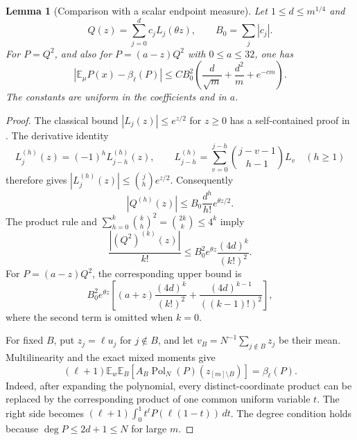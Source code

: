 \documentclass[11pt]{article}
\newtheorem{lemma}{Lemma}
\newcommand{\E}{\mathbb E}
\newcommand{\Pol}{\operatorname{Pol}}
\begin{document}
\begin{lemma}[Comparison with a scalar endpoint measure]\label{comparison}
Let $1\le d\le m^{1/4}$ and
\[
 Q(z)=\sum_{j=0}^d c_jL_j(\theta z),\qquad
 B_0=\sum_j|c_j|.
\]
For $P=Q^2$, and also for $P=(a-z)Q^2$ with $0\le a\le32$, one has
\[
 \left|\E_\mu P(x)-\beta_\ell(P)\right|
 \le C B_0^2\left(\frac d{\sqrt m}+\frac{d^2}{m}+e^{-cm}\right).
\tag{*}
\]
The constants are uniform in the coefficients and in $a$.
\end{lemma}
\begin{proof}
The classical bound $|L_j(z)|\le e^{z/2}$ for $z\ge0$ has a
self-contained proof in
.
The derivative identity
\[
 L_j^{(h)}(z)=(-1)^hL_{j-h}^{(h)}(z),\qquad
 L_{j-h}^{(h)}=\sum_{v=0}^{j-h}\binom{j-v-1}{h-1}L_v
 \quad(h\ge1)
\]
therefore gives $|L_j^{(h)}(z)|\le\binom jh e^{z/2}$.
Consequently
\[
 |Q^{(h)}(z)|\le B_0\frac{d^h}{h!}e^{\theta z/2}.
\]
The product rule and
$\sum_{h=0}^k\binom kh^2=\binom{2k}k\le4^k$ imply
\begin{equation}\label{squarederivatives}
 \frac{|(Q^2)^{(k)}(z)|}{k!}
 \le B_0^2 e^{\theta z}\frac{(4d)^k}{(k!)^2}.
\end{equation}
For $P=(a-z)Q^2$, the corresponding upper bound is
\begin{equation}\label{linear-squarederivatives}
 B_0^2 e^{\theta z}\left[
  (a+z)\frac{(4d)^k}{(k!)^2}
  +\frac{(4d)^{k-1}}{((k-1)!)^2}\right],
\end{equation}
where the second term is omitted when $k=0$.

For fixed $B$, put $z_j=\ell u_j$ for $j\notin B$, and let
$v_B=N^{-1}\sum_{j\notin B}z_j$ be their mean.
Multilinearity and the exact mixed moments give
\begin{equation}\label{exactpolarization}
 (\ell+1)\E_w\E_B\left[A_B\Pol_N(P)(z_{[m]\setminus B})\right]
       =\beta_\ell(P).
\end{equation}
Indeed, after expanding the polynomial, every distinct-coordinate
product can be replaced by the corresponding product of one common
uniform variable $t$. The right side becomes
$(\ell+1)\int_0^1t^\ell P(\ell(1-t))\,dt$.
The degree condition holds because $\deg P\le2d+1\le N$ for large $m$.


\end{proof}
\end{document}
